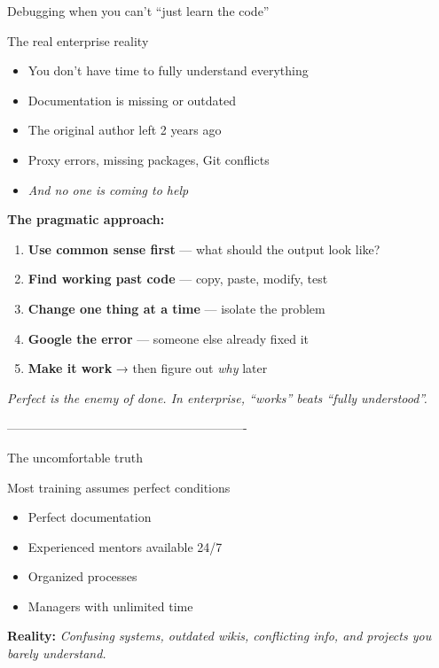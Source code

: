 \documentclass[aspectratio=169, 11pt]{beamer}
\begin{document}
	
	\begin{frame}{Debugging when you can't ``just learn the code''}
		\begin{block}{The real enterprise reality}
			\begin{itemize}
				\item You don't have time to fully understand everything
				\item Documentation is missing or outdated
				\item The original author left 2 years ago
				\item Proxy errors, missing packages, Git conflicts
				\item \textit{And no one is coming to help}
			\end{itemize}
		\end{block}
		\vspace{0.2cm}
		\alert{\textbf{The pragmatic approach:}}
		\begin{enumerate}
			\item \textbf{Use common sense first} — what should the output look like?
			\item \textbf{Find working past code} — copy, paste, modify, test
			\item \textbf{Change one thing at a time} — isolate the problem
			\item \textbf{Google the error} — someone else already fixed it
			\item \textbf{Make it work} → then figure out \textit{why} later
		\end{enumerate}
		\vspace{0.1cm}
		\textit{Perfect is the enemy of done. In enterprise, ``works'' beats ``fully understood''.}
	\end{frame} ----------------------------------------------------------
	\begin{frame}{The uncomfortable truth}
		\begin{block}{Most training assumes perfect conditions}
			\begin{itemize}
				\item Perfect documentation
				\item Experienced mentors available 24/7
				\item Organized processes
				\item Managers with unlimited time
			\end{itemize}
		\end{block}
		\vspace{0.3cm}
		\alert{\textbf{Reality:}} \textit{Confusing systems, outdated wikis, conflicting info, and projects you barely understand.}
	\end{frame}
	
\end{document}
